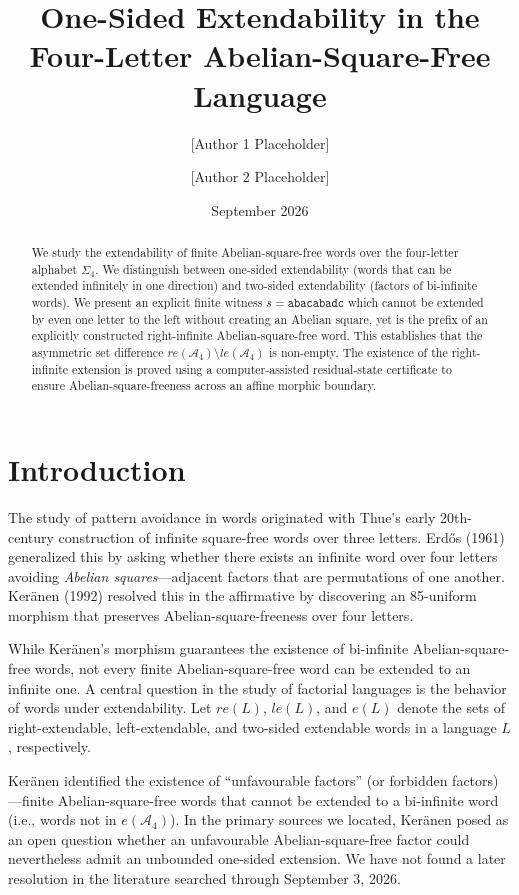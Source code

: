 \documentclass[12pt]{article}
\title{One-Sided Extendability in the Four-Letter Abelian-Square-Free Language}
\author{[Author 1 Placeholder] \and [Author 2 Placeholder]}
\date{September 2026}
\begin{document}
\maketitle

\begin{abstract}
We study the extendability of finite Abelian-square-free words over the four-letter alphabet $\Sigma_4$. We distinguish between one-sided extendability (words that can be extended infinitely in one direction) and two-sided extendability (factors of bi-infinite words). We present an explicit finite witness $s = \texttt{abacabadc}$ which cannot be extended by even one letter to the left without creating an Abelian square, yet is the prefix of an explicitly constructed right-infinite Abelian-square-free word. This establishes that the asymmetric set difference $re(\mathcal{A}_4) \setminus le(\mathcal{A}_4)$ is non-empty. The existence of the right-infinite extension is proved using a computer-assisted residual-state certificate to ensure Abelian-square-freeness across an affine morphic boundary.
\end{abstract}

\section{Introduction}
The study of pattern avoidance in words originated with Thue's early 20th-century construction of infinite square-free words over three letters. Erd\H{o}s (1961) generalized this by asking whether there exists an infinite word over four letters avoiding \textit{Abelian squares}---adjacent factors that are permutations of one another. Ker\"anen (1992) resolved this in the affirmative by discovering an 85-uniform morphism that preserves Abelian-square-freeness over four letters.

While Ker\"anen's morphism guarantees the existence of bi-infinite Abelian-square-free words, not every finite Abelian-square-free word can be extended to an infinite one. A central question in the study of factorial languages is the behavior of words under extendability. Let $re(L)$, $le(L)$, and $e(L)$ denote the sets of right-extendable, left-extendable, and two-sided extendable words in a language $L$, respectively.

Ker\"anen identified the existence of ``unfavourable factors'' (or forbidden factors)---finite Abelian-square-free words that cannot be extended to a bi-infinite word (i.e., words not in $e(\mathcal{A}_4)$). In the primary sources we located, Ker\"anen posed as an open question whether an unfavourable Abelian-square-free factor could nevertheless admit an unbounded one-sided extension. We have not found a later resolution in the literature searched through September 3, 2026.
\end{document}
